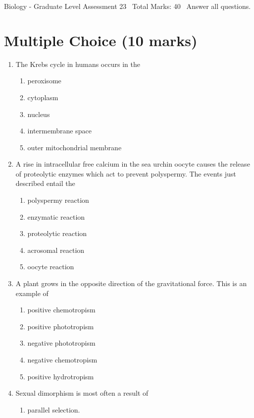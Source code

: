 \documentclass[12pt]{article}
\begin{document}
\begin{center}
Biology - Graduate Level Assessment 23 \
Total Marks: 40 \
Answer all questions.
\end{center}

\section*{Multiple Choice (10 marks)}
\begin{enumerate}[label=\arabic*.]
\item The Krebs cycle in humans occurs in the
\begin{enumerate}[label=(\alph*)]
    \item peroxisome
    \item cytoplasm
    \item nucleus
    \item intermembrane space
    \item outer mitochondrial membrane
\end{enumerate}
\item A rise in intracellular free calcium in the sea urchin oocyte causes the release of proteolytic enzymes which act to prevent polyspermy. The events just described entail the
\begin{enumerate}[label=(\alph*)]
    \item polyspermy reaction
    \item enzymatic reaction
    \item proteolytic reaction
    \item acrosomal reaction
    \item oocyte reaction
\end{enumerate}
\item A plant grows in the opposite direction of the gravitational force. This is an example of
\begin{enumerate}[label=(\alph*)]
    \item positive chemotropism
    \item positive phototropism
    \item negative phototropism
    \item negative chemotropism
    \item positive hydrotropism
\end{enumerate}
\item Sexual dimorphism is most often a result of
\begin{enumerate}[label=(\alph*)]
    \item parallel selection.

\end{enumerate}
\end{enumerate}
\end{document}
